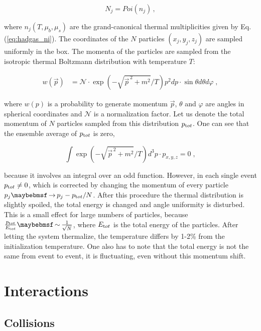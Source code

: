 \begin{equation}
  N_{j} = Poi(n_j) \,,
\end{equation}

where $n_j(T, \mu_b, \mu_s)$ are the grand-canonical thermal multiplicities
given by Eq. (\ref{eq:hadgas_ni}). The coordinates of the $N$ particles $(x_j, y_j,
z_j)$ are sampled uniformly in the box. The momenta of the particles are
sampled from the isotropic thermal Boltzmann distribution with temperature $T$:

\begin{align}
    w(\vec{p}) &= \mathcal{N} \cdot \exp(-\sqrt{\vec{p}^{\,2} + m^2}/T) p^2 dp
                  \cdot \sin \theta d\theta d\varphi \; ,
\end{align}

where $w(p)$ is a probability to generate momentum $\vec{p}$, $\theta$ and
$\varphi$ are angles in spherical coordinates and $\mathcal{N}$ is a normalization
factor. Let us denote the total momentum of $N$ particles sampled from this
distribution $p_{\textrm tot}$. One can see that the ensemble average of $p_{\textrm
tot}$ is zero,

\begin{equation}
    \int \exp(-\sqrt{\vec{p}^{\,2} + m^2}/T) d^3p \cdot p_{x,y,z} = 0 \; ,
\end{equation}

because it involves an integral over an odd function. However, in each single
event $p_{\textrm tot} \neq 0$, which is corrected by changing the momentum of
every particle $p_j \to p_j - p_{\textrm tot}/N$. After this procedure the thermal
distribution is slightly spoiled, the total energy is changed and angle
uniformity is disturbed. This is a small effect for large numbers of particles, because
$\frac{p_{\textrm tot}}{E_{\textrm tot}} \sim \frac{1}{\sqrt{N}}$, where
$E_{\textrm tot}$ is the total energy of the particles. After letting the system
thermalize, the temperature differs by 1-2\% from the initialization temperature. One
also has to note that the total energy is not the same from event to event, it is
fluctuating, even without this momentum shift.

\section{Interactions}

\subsection{Collisions}

